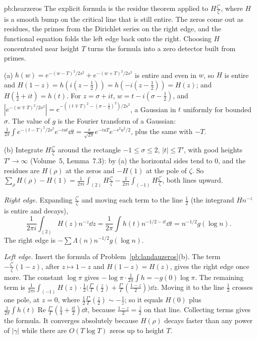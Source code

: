 \begin{solution}{pb:hearzeros}
\idea The explicit formula is the residue theorem applied to $H\frac{\zeta'}\zeta$, where $H$ is a smooth bump on the critical line that is still entire. The zeros come out as
residues, the primes from the Dirichlet series on the right edge, and the functional equation folds the left edge back onto the right. Choosing $H$ concentrated near height
$T$ turns the formula into a zero detector built from primes.

\writeup (a) $h(w)=e^{-(w-T)^2/2s^2}+e^{-(w+T)^2/2s^2}$ is entire and even in $w$, so $H$ is entire and $H(1-z)=h(i(z-\frac12))=h(-i(z-\frac12))=H(z)$; and $H(\frac12+it)=h(t)$.
For $z=\sigma+it$, $w=t-i(\sigma-\frac12)$, and $|e^{-(w\mp T)^2/2s^2}|=e^{-((t\mp T)^2-(\sigma-\frac12)^2)/2s^2}$, a Gaussian in $t$ uniformly for bounded $\sigma$. The value of $g$ is the
Fourier transform of a Gaussian: $\frac1{2\pi}\int e^{-(t-T)^2/2s^2}e^{-iut}\dd t=\frac s{\sqrt{2\pi}}e^{-iuT}e^{-s^2u^2/2}$, plus the same with $-T$.

(b) Integrate $H\frac{\zeta'}\zeta$ around the rectangle $-1\le\sigma\le2$, $|t|\le T'$, with good heights $T'\to\infty$ (Volume~5, Lemma~7.3): by (a) the horizontal sides tend to $0$,
and the residues are $H(\rho)$ at the zeros and $-H(1)$ at the pole of $\zeta$. So
$\sum_\rho H(\rho)-H(1)=\frac1{2\pi i}\int_{(2)}H\frac{\zeta'}\zeta-\frac1{2\pi i}\int_{(-1)}H\frac{\zeta'}\zeta$, both lines upward.

\emph{Right edge.} Expanding $\frac{\zeta'}\zeta$ and moving each term to the line $\frac12$ (the integrand $Hn^{-z}$ is entire and decays),
\[
\frac1{2\pi i}\int_{(2)}H(z)n^{-z}\dd z=\frac1{2\pi}\int h(t)n^{-1/2-it}\dd t=n^{-1/2}g(\log n).
\]
The right edge is $-\sum\Lambda(n)n^{-1/2}g(\log n)$.

\emph{Left edge.} Insert the formula of Problem~\ref{pb:landauzeros}(b). The term $-\frac{\zeta'}\zeta(1-z)$, after $z\mapsto1-z$ and $H(1-z)=H(z)$, gives the right edge
once more. The constant $\log\pi$ gives $-\log\pi\cdot\frac1{2\pi}\int h=-g(0)\log\pi$. The remaining term is $\frac1{2\pi i}\int_{(-1)}H(z)\cdot\frac12\bigl(\frac{\Gamma'}\Gamma(\frac z2)+\frac{\Gamma'}\Gamma(\frac{1-z}2)\bigr)\dd z$.
Moving it to the line $\frac12$ crosses one pole, at $z=0$, where $\frac12\frac{\Gamma'}\Gamma(\frac z2)\sim-\frac1z$; so it equals $H(0)$ plus
$\frac1{2\pi}\int h(t)\operatorname{Re}\frac{\Gamma'}\Gamma(\frac14+\frac{it}2)\dd t$, because $\frac{1-z}2=\overline{\frac z2}$ on that line. Collecting terms gives the formula.
It converges absolutely because $H(\rho)$ decays faster than any power of $|\gamma|$ while there are $O(T\log T)$ zeros up to height $T$.


\end{solution}
